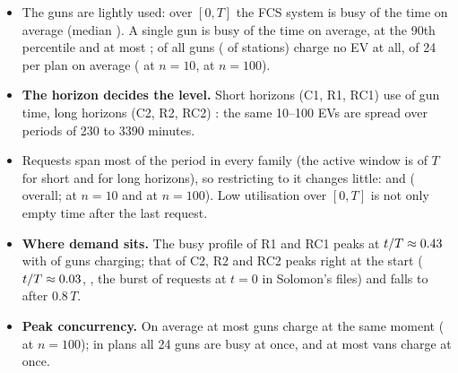 \begin{itemize}
  \item The guns are lightly used: over $[0,T]$ the FCS system is busy \UGunMean\pct{} of the time on average (median \UGunMedian\pct). A single gun is busy \UPerGunMean\pct{} of the time on average, \UPerGunNinety\pct{} at the 90th percentile and at most \UPerGunMax\pct; \UGunIdleShare\pct{} of all guns (\UStationIdleShare\pct{} of stations) charge no EV at all, \UIdleGunsMean{} of 24 per plan on average (\UIdleGunsTen{} at $n=10$, \UIdleGunsHundred{} at $n=100$).
  \item \textbf{The horizon decides the level.} Short horizons (C1, R1, RC1) use \UGunShort\pct{} of gun time, long horizons (C2, R2, RC2) \UGunLong\pct: the same 10--100 EVs are spread over periods of 230 to 3390 minutes.
  \item Requests span most of the period in every family (the active window is \UActiveShareShort\pct{} of $T$ for short and \UActiveShareLong\pct{} for long horizons), so restricting to it changes little: \UGunActiveShort\pct{} and \UGunActiveLong\pct{} (\UGunActiveMean\pct{} overall; \UGunActiveTen\pct{} at $n=10$ and \UGunActiveHundred\pct{} at $n=100$). Low utilisation over $[0,T]$ is not only empty time after the last request.
  \item \textbf{Where demand sits.} The busy profile of R1 and RC1 peaks at $t/T\approx0.43$ with \UProfileMaxShort\pct{} of guns charging; that of C2, R2 and RC2 peaks right at the start ($t/T\approx0.03$, \UProfileMaxLong\pct, the burst of requests at $t=0$ in Solomon's files) and falls to \UProfileLateLong\pct{} after $0.8\,T$.
  \item \textbf{Peak concurrency.} On average at most \UPeakGunsMean{} guns charge at the same moment (\UPeakGunsHundred{} at $n=100$); in \UPeakGunsFull{} plans all 24 guns are busy at once, and at most \UPeakVansMax{} vans charge at once.
\end{itemize}

